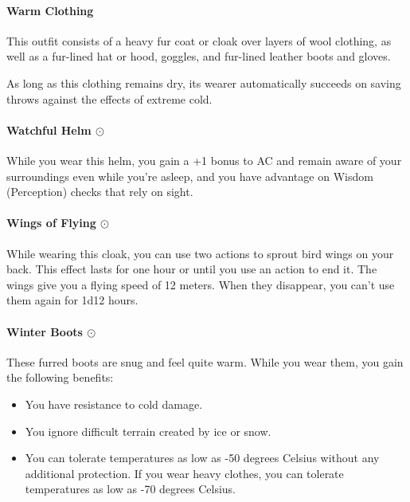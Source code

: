     \paragraph{Warm Clothing}
        This outfit consists of a heavy fur coat or cloak over layers of wool clothing, as well as a fur-lined hat or hood, goggles, and fur-lined leather boots and gloves.

        As long as this clothing remains dry, its wearer automatically succeeds on saving throws against the effects of extreme cold.
    \paragraph{Watchful Helm $\odot$}
        While you wear this helm, you gain a +1 bonus to AC and remain aware of your surroundings even while you're asleep, and you have advantage on Wisdom (Perception) checks that rely on sight.
    \paragraph{Wings of Flying $\odot$}
        While wearing this cloak, you can use two actions to sprout bird wings on your back.
        This effect lasts for one hour or until you use an action to end it.
        The wings give you a flying speed of 12 meters.
        When they disappear, you can't use them again for 1d12 hours.
    \paragraph{Winter Boots $\odot$}
        These furred boots are snug and feel quite warm.
        While you wear them, you gain the following benefits:
        \begin{itemize}
            \item You have resistance to cold damage.
            \item You ignore difficult terrain created by ice or snow.
            \item You can tolerate temperatures as low as -50 degrees Celsius without any additional protection.
            If you wear heavy clothes, you can tolerate temperatures as low as -70 degrees Celsius.
        \end{itemize}
\newpage~\newpage
